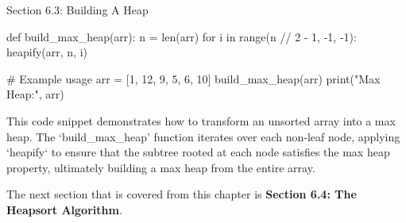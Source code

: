 \begin{notes}{Section 6.3: Building A Heap}
\begin{highlight}
\begin{code}[Python]
    def build_max_heap(arr):
        n = len(arr)
        for i in range(n // 2 - 1, -1, -1):
            heapify(arr, n, i)
    
    # Example usage
    arr = [1, 12, 9, 5, 6, 10]
    build_max_heap(arr)
    print("Max Heap:", arr)
    \end{code}
        
        This code snippet demonstrates how to transform an unsorted array into a max heap. The `build\_max\_heap' function iterates over each non-leaf node, applying `heapify` to ensure that the subtree 
        rooted at each node satisfies the max heap property, ultimately building a max heap from the entire array.
    \end{highlight}
\end{notes}

The next section that is covered from this chapter is \textbf{Section 6.4: The Heapsort Algorithm}.

